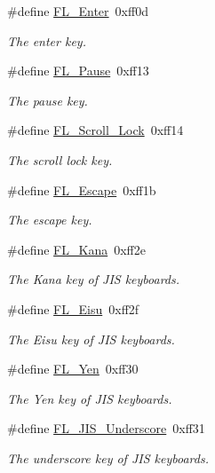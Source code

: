 \begin{Indent}
\begin{DoxyCompactItemize}
\#define \hyperlink{_enumerations_8_h_ab4a527fe4d93303976de2fbfec05e19b}{F\+L\+\_\+\+Enter}~0xff0d
\begin{DoxyCompactList}\small\item\em The enter key. \end{DoxyCompactList}\item 
\#define \hyperlink{_enumerations_8_h_a701e11753a0c38777cb49989de8f0195}{F\+L\+\_\+\+Pause}~0xff13
\begin{DoxyCompactList}\small\item\em The pause key. \end{DoxyCompactList}\item 
\#define \hyperlink{_enumerations_8_h_a75315b814f32abe29e7b8d0c43be54d9}{F\+L\+\_\+\+Scroll\+\_\+\+Lock}~0xff14
\begin{DoxyCompactList}\small\item\em The scroll lock key. \end{DoxyCompactList}\item 
\#define \hyperlink{_enumerations_8_h_a91b983ebe4cd86393e2addb8ab40a326}{F\+L\+\_\+\+Escape}~0xff1b
\begin{DoxyCompactList}\small\item\em The escape key. \end{DoxyCompactList}\item 
\#define \hyperlink{_enumerations_8_h_a48db449b0331e8e64b0b494eb194cea5}{F\+L\+\_\+\+Kana}~0xff2e
\begin{DoxyCompactList}\small\item\em The Kana key of J\+IS keyboards. \end{DoxyCompactList}\item 
\#define \hyperlink{_enumerations_8_h_a3c7fc1e50954da94b6d5d2bad4ab3090}{F\+L\+\_\+\+Eisu}~0xff2f
\begin{DoxyCompactList}\small\item\em The Eisu key of J\+IS keyboards. \end{DoxyCompactList}\item 
\#define \hyperlink{_enumerations_8_h_ac6cd51105d96ffad3571677b0d285770}{F\+L\+\_\+\+Yen}~0xff30
\begin{DoxyCompactList}\small\item\em The Yen key of J\+IS keyboards. \end{DoxyCompactList}\item 
\#define \hyperlink{_enumerations_8_h_aef1720c9124147c2aea2b647089b2518}{F\+L\+\_\+\+J\+I\+S\+\_\+\+Underscore}~0xff31
\begin{DoxyCompactList}\small\item\em The underscore key of J\+IS keyboards. \end{DoxyCompactList}\item 

\end{DoxyCompactItemize}
\end{Indent}
